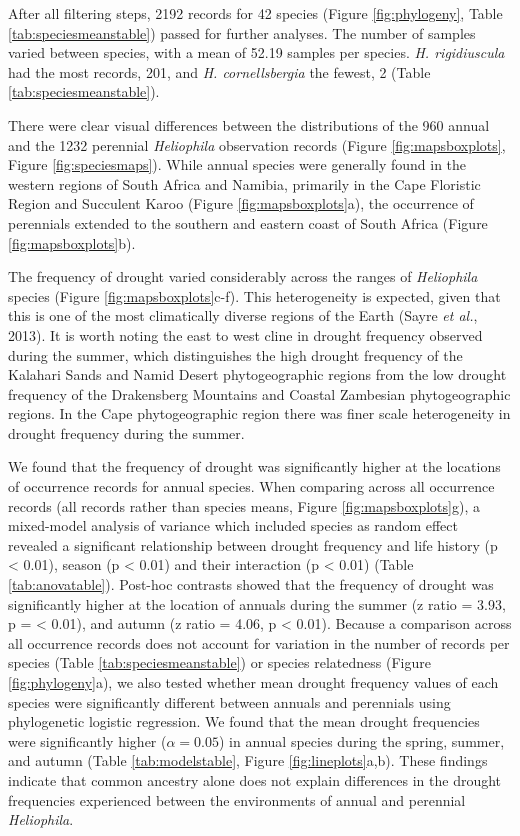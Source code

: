 \documentclass[man,floatsintext]{apa6}
\theoremstyle{definition}
\theoremstyle{definition}
\theoremstyle{definition}
\theoremstyle{remark}
\begin{document}
After all filtering steps, 2192 records for 42 species (Figure
\ref{fig:phylogeny}, Table \ref{tab:speciesmeanstable}) passed for
further analyses. The number of samples varied between species, with a
mean of 52.19 samples per species. \emph{H. rigidiuscula} had the most
records, 201, and \emph{H. cornellsbergia} the fewest, 2 (Table
\ref{tab:speciesmeanstable}).

There were clear visual differences between the distributions of the 960
annual and the 1232 perennial \emph{Heliophila} observation records
(Figure \ref{fig:mapsboxplots}, Figure \ref{fig:speciesmaps}). While
annual species were generally found in the western regions of South
Africa and Namibia, primarily in the Cape Floristic Region and Succulent
Karoo (Figure \ref{fig:mapsboxplots}a), the occurrence of perennials
extended to the southern and eastern coast of South Africa (Figure
\ref{fig:mapsboxplots}b).

The frequency of drought varied considerably across the ranges of
\emph{Heliophila} species (Figure \ref{fig:mapsboxplots}c-f). This
heterogeneity is expected, given that this is one of the most
climatically diverse regions of the Earth (Sayre \emph{et al.}, 2013).
It is worth noting the east to west cline in drought frequency observed
during the summer, which distinguishes the high drought frequency of the
Kalahari Sands and Namid Desert phytogeographic regions from the low
drought frequency of the Drakensberg Mountains and Coastal Zambesian
phytogeographic regions. In the Cape phytogeographic region there was
finer scale heterogeneity in drought frequency during the summer.

We found that the frequency of drought was significantly higher at the
locations of occurrence records for annual species. When comparing
across all occurrence records (all records rather than species means,
Figure \ref{fig:mapsboxplots}g), a mixed-model analysis of variance
which included species as random effect revealed a significant
relationship between drought frequency and life history (p \textless{}
0.01), season (p \textless{} 0.01) and their interaction (p \textless{}
0.01) (Table \ref{tab:anovatable}). Post-hoc contrasts showed that the
frequency of drought was significantly higher at the location of annuals
during the summer (z ratio = 3.93, p = \textless{} 0.01), and autumn (z
ratio = 4.06, p \textless{} 0.01). Because a comparison across all
occurrence records does not account for variation in the number of
records per species (Table \ref{tab:speciesmeanstable}) or species
relatedness (Figure \ref{fig:phylogeny}a), we also tested whether mean
drought frequency values of each species were significantly different
between annuals and perennials using phylogenetic logistic regression.
We found that the mean drought frequencies were significantly higher
(\(\alpha = 0.05\)) in annual species during the spring, summer, and
autumn (Table \ref{tab:modelstable}, Figure \ref{fig:lineplots}a,b).
These findings indicate that common ancestry alone does not explain
differences in the drought frequencies experienced between the
environments of annual and perennial \emph{Heliophila}.
\end{document}
